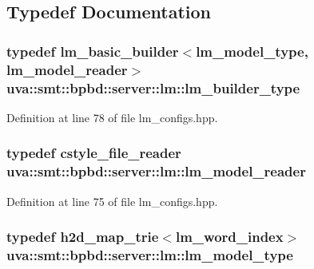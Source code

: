 \subsection{Typedef Documentation}
\hypertarget{namespaceuva_1_1smt_1_1bpbd_1_1server_1_1lm_a145b3eb02a2cb53bc18b70909aba742f}{}
\subsubsection[{lm\+\_\+builder\+\_\+type}]{\setlength{\rightskip}{0pt plus 5cm}typedef {\bf lm\+\_\+basic\+\_\+builder}$<${\bf lm\+\_\+model\+\_\+type}, {\bf lm\+\_\+model\+\_\+reader}$>$ {\bf uva\+::smt\+::bpbd\+::server\+::lm\+::lm\+\_\+builder\+\_\+type}}\label{namespaceuva_1_1smt_1_1bpbd_1_1server_1_1lm_a145b3eb02a2cb53bc18b70909aba742f}


Definition at line 78 of file lm\+\_\+configs.\+hpp.

\hypertarget{namespaceuva_1_1smt_1_1bpbd_1_1server_1_1lm_a547d3f566b0e505cae1c65a9ce6c9a64}{}
\subsubsection[{lm\+\_\+model\+\_\+reader}]{\setlength{\rightskip}{0pt plus 5cm}typedef {\bf cstyle\+\_\+file\+\_\+reader} {\bf uva\+::smt\+::bpbd\+::server\+::lm\+::lm\+\_\+model\+\_\+reader}}\label{namespaceuva_1_1smt_1_1bpbd_1_1server_1_1lm_a547d3f566b0e505cae1c65a9ce6c9a64}


Definition at line 75 of file lm\+\_\+configs.\+hpp.

\hypertarget{namespaceuva_1_1smt_1_1bpbd_1_1server_1_1lm_aca89ac213c9f12240dbf6ac0953bd75f}{}
\subsubsection[{lm\+\_\+model\+\_\+type}]{\setlength{\rightskip}{0pt plus 5cm}typedef {\bf h2d\+\_\+map\+\_\+trie}$<${\bf lm\+\_\+word\+\_\+index}$>$ {\bf uva\+::smt\+::bpbd\+::server\+::lm\+::lm\+\_\+model\+\_\+type}}\label{namespaceuva_1_1smt_1_1bpbd_1_1server_1_1lm_aca89ac213c9f12240dbf6ac0953bd75f}


